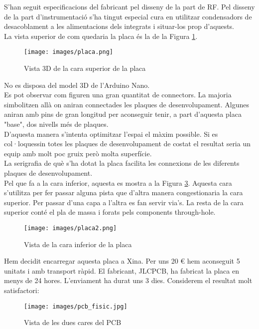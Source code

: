 \newline S'han seguit especificacions del fabricant pel disseny de la part de RF. Pel disseny de la part d'instrumentació s'ha tingut especial cura en utilitzar condensadors de desacoblament a les alimentacions dels integrats i situar-los prop d'aquests.\\
\newline La vista superior de com quedaria la placa és la de la Figura \ref{fig:3d_sup}.
\begin{figure}[H]
\begin{center}
\texttt{[image: images/placa.png]}
\end{center}
\caption{Vista 3D de la cara superior de la placa}
\label{fig:3d_sup}
\end{figure}

\noindent No es disposa del model 3D de l'Arduino Nano.\\
\newline Es pot observar com figuren una gran quantitat de connectors. La majoria simbolitzen allà on aniran connectades les plaques de desenvolupament. Algunes aniran amb pins de gran longitud per aconseguir tenir, a part d'aquesta placa "base", dos nivells més de plaques.\\
\newline D'aquesta manera s'intenta optimitzar l'espai el màxim possible. Si es col·loquessin totes les plaques de desenvolupament de costat el resultat seria un equip amb molt poc gruix però molta superfície.\\
\newline La serigrafia de què s'ha dotat la placa facilita les connexions de les diferents plaques de desenvolupament.\\
\newline Pel que fa a la cara inferior, aquesta es mostra a la Figura \ref{fig:inf}. Aquesta cara s'utilitza per fer passar alguna pista que d'altra manera congestionaria la cara superior. Per passar d'una capa a l'altra es fan servir via's. La resta de la cara superior conté el pla de massa i forats pels components through-hole.

\begin{figure}[H]
\begin{center}
\texttt{[image: images/placa2.png]}
\end{center}
\caption{Vista de la cara inferior de la placa}
\label{fig:inf}
\end{figure}
\noindent Hem decidit encarregar aquesta placa a Xina. Per uns 20 € hem aconseguit 5 unitats i amb transport ràpid. El fabricant, JLCPCB, ha fabricat la placa en menys de 24 hores. L'enviament ha durat uns 3 dies. Considerem el resultat molt satisfactori:
\begin{figure}[H]
\begin{center}
\texttt{[image: images/pcb\_fisic.jpg]}
\end{center}
\caption{Vista de les dues cares del PCB}
\label{fig:inf}
\end{figure}

